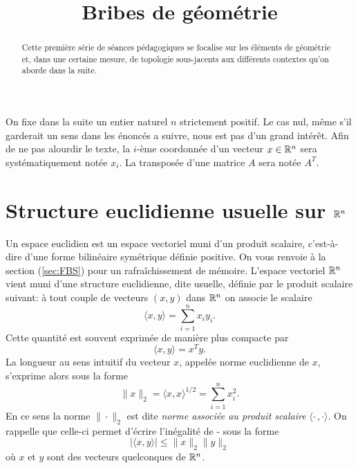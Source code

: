 \documentclass[11pt, a4paper]{article}
\title{%
  { \huge Bribes de géométrie}%
}
\author{}
\date{}
\begin{document}
\maketitle\thispagestyle{fancy}

\begin{abstract}
  Cette première série de séances pédagogiques se focalise sur les
  éléments de géométrie et, dans une certaine mesure, de topologie
  sous-jacents aux différents contextes qu'on aborde dans la
  suite.
\end{abstract}

\tableofcontents

\newpage

\begin{center}
 \begin{minipage}{.6\textwidth}
    \begin{convention}
      On fixe dans la suite un entier naturel $n$ strictement positif. Le
      cas nul, même s'il garderait un sens dans les énoncés a suivre, nous
      est pas d'un grand intérêt. Afin de ne pas alourdir le texte, la
      $i$-ème coordonnée d'un vecteur $x \in \mathbb{R}^n$ sera
      systématiquement notée $x_i$. La transposée d'une matrice $A$ sera
      notée $A^T$.
    \end{convention}
  \end{minipage}
\end{center}

\section{Structure euclidienne usuelle sur $\mathbb{R}^n$}

Un espace euclidien est un espace vectoriel muni d'un produit
scalaire, c'est-à-dire d'une forme bilinéaire symétrique définie
positive. On vous renvoie à la section (\ref{sec:FBS}) pour un
rafraîchissement de mémoire. L'espace vectoriel $\mathbb{R}^n$ vient
muni d'une structure euclidienne, dite usuelle, définie par le produit
scalaire suivant: à tout couple de vecteurs $(x, y)$ dans
$\mathbb{R}^n$ on associe le scalaire
\[
\langle x, y \rangle = \sum_{i=1}^n x_iy_i.
\]
Cette quantité est souvent exprimée de manière plus compacte par
\[
\langle x, y \rangle = x^Ty.
\]
La longueur au sens intuitif du vecteur $x$, appelée norme euclidienne
de $x$, s'exprime alors sous la forme
\[
  \|x\|_2 = \langle x, x\rangle^{1/2} = \sum_{i=1}^n x_i^2.
\]
En ce sens la norme $\|\cdot\|_2$ est dite \emph{norme associée au
  produit scalaire} $\langle \cdot\,, \cdot \rangle$. On rappelle que
celle-ci permet d'écrire l'inégalité de -
sous la forme
\[
\big| \langle x, y\rangle \big| \leq \|x\|_2\|y\|_2
\]
où $x$ et $y$ sont des vecteurs quelconques de $\mathbb{R}^n$.
\end{document}
